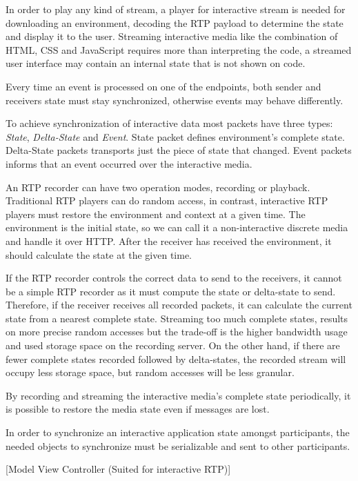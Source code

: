 	In order to play any kind of stream, a player for interactive stream is needed for downloading an environment, decoding the \ac{RTP} payload to determine the state and display it to the user. Streaming interactive media like the combination of \ac{HTML}, \ac{CSS} and JavaScript requires more than interpreting the code, a streamed user interface may contain an internal state that is not shown on code.

	Every time an event is processed on one of the endpoints, both sender and receivers state must stay synchronized, otherwise events may behave differently.

	To achieve synchronization of interactive data most packets have three types: \textit{State}, \textit{Delta-State} and \textit{Event}. State packet defines environment's complete state. Delta-State packets transports just the piece of state that changed. Event packets informs that an event occurred over the interactive media. 

	An \ac{RTP} recorder can have two operation modes, recording or playback. Traditional \ac{RTP} players can do random access, in contrast, interactive \ac{RTP} players must restore the environment and context at a given time. The environment is the initial state, so we can call it a non-interactive discrete media and handle it over \ac{HTTP}. After the receiver has received the environment, it should calculate the state at the given time. 

	If the \ac{RTP} recorder controls the correct data to send to the receivers, it cannot be a simple \ac{RTP} recorder as it must compute the state or delta-state to send. Therefore, if the receiver receives all recorded packets, it can calculate the current state from a nearest complete state. Streaming too much complete states, results on more precise random accesses but the trade-off is the higher bandwidth usage and used storage space on the recording server. On the other hand, if there are fewer complete states recorded followed by delta-states, the recorded stream will occupy less storage space, but random accesses will be less granular.

	By recording and streaming the interactive media's complete state periodically, it is possible to restore the media state even if messages are lost.

	In order to synchronize an interactive application state amongst participants, the needed objects to synchronize must be serializable and sent to other participants.

  {\color{red}[Model View Controller (Suited for interactive RTP)]}

